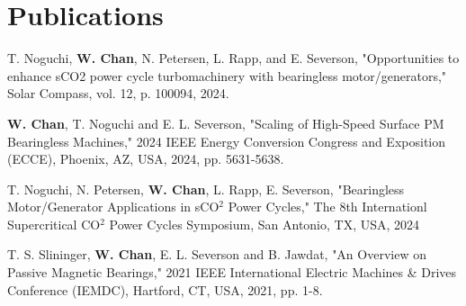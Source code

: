 \section{\sc Publications}

T. Noguchi, \textbf{W. Chan}, N. Petersen, L. Rapp, and E. Severson, "Opportunities to enhance sCO2 power cycle turbomachinery with bearingless motor/generators," Solar Compass, vol. 12, p. 100094, 2024.

\textbf{W. Chan}, T. Noguchi and E. L. Severson, "Scaling of High-Speed Surface PM Bearingless Machines," 2024 IEEE Energy Conversion Congress and Exposition (ECCE), Phoenix, AZ, USA, 2024, pp. 5631-5638.

T. Noguchi, N. Petersen, \textbf{W. Chan}, L. Rapp, E. Severson,  "Bearingless Motor/Generator Applications in sCO$^2$ Power Cycles," The 8th Internationl Supercritical CO$^2$ Power Cycles Symposium, San Antonio, TX, USA, 2024


T. S. Slininger, \textbf{W. Chan}, E. L. Severson and B. Jawdat, "An Overview on Passive Magnetic Bearings," 2021 IEEE International Electric Machines \& Drives Conference (IEMDC), Hartford, CT, USA, 2021, pp. 1-8.


\endinput